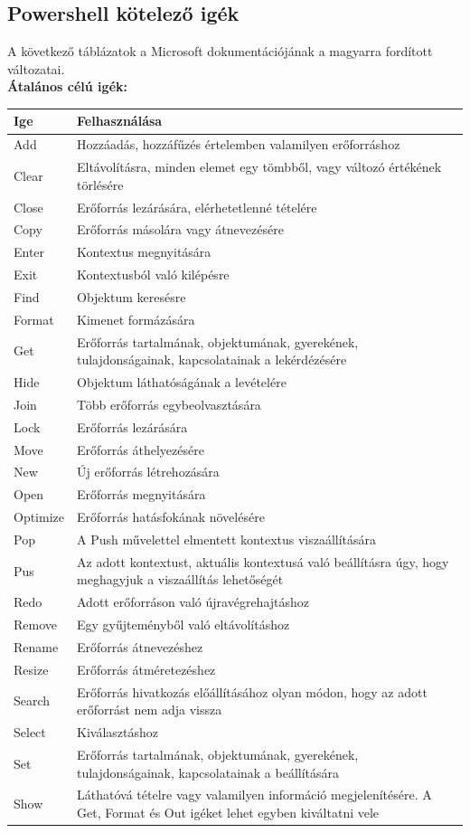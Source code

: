 \documentclass[12pt,oneside,justify,table]{book}
\begin{document}
\begin{appendices}
\chapter{Powershell kötelező igék}
\label{appendix:powershellRequiredVerbs}
A következő táblázatok a Microsoft dokumentációjának a magyarra fordított változatai. \cite{PowerShellGuidelines} \\
\textbf{Átalános célú igék:} \cite{VerbsCommon}\\
\begin{tabularx}{\linewidth}{l|X}
\rowcolor{blue!50}
\textbf{Ige} & \textbf{Felhasználása} \\
\hline
Add & Hozzáadás, hozzáfűzés értelemben valamilyen erőforráshoz \\
Clear & Eltávolításra, minden elemet egy tömbből, vagy változó értékének törlésére \\
Close & Erőforrás lezárására, elérhetetlenné tételére \\
Copy & Erőforrás másolára vagy átnevezésére \\
Enter & Kontextus megnyitására \\
Exit & Kontextusból való kilépésre \\
Find & Objektum keresésre \\
Format & Kimenet formázására \\
Get & Erőforrás tartalmának, objektumának, gyerekének, tulajdonságainak, kapcsolatainak a lekérdézésére \\
Hide & Objektum láthatóságának a levételére \\
Join & Több erőforrás egybeolvasztására \\
Lock & Erőforrás lezárására \\
Move & Erőforrás áthelyezésére \\
New & Új erőforrás létrehozására \\
Open & Erőforrás megnyitására \\
Optimize & Erőforrás hatásfokának növelésére \\
Pop & A Push művelettel elmentett kontextus viszaállítására \\ 
Pus & Az adott kontextust, aktuális kontextusá való beállításra úgy, hogy meghagyjuk a viszaállítás lehetőségét \\
Redo & Adott erőforráson való újravégrehajtáshoz \\
Remove & Egy gyűjteményből való eltávolításhoz \\
Rename & Erőforrás átnevezéshez \\
Resize & Erőforrás átméretezéshez \\
Search & Erőforrás hivatkozás előállításához olyan módon, hogy az adott erőforrást nem adja vissza \\
Select & Kiválasztáshoz \\
Set & Erőforrás tartalmának, objektumának, gyerekének, tulajdonságainak, kapcsolatainak a beállítására \\
Show & Láthatóvá tételre vagy valamilyen információ megjelenítésére. A Get, Format és Out igéket lehet egyben kiváltatni vele \\
\end{tabularx}


\end{appendices}
\end{document}
